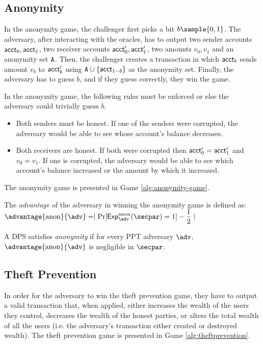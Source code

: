 \subsection{Anonymity}

In the anonymity game, the challenger first picks a bit $b\sample \{0,1\}$. The adversary, after interacting with the oracles, has to output two sender accounts $\textup{\textsf{acct}}_0, \textup{\textsf{acct}}_1$, two receiver accounts $\textup{\textsf{acct}}_0^\prime, \textup{\textsf{acct}}_1^\prime$, two amounts $v_0, v_1$ and an anonymity set ${\mathtt{A}}$. Then, the challenger creates a transaction in which $\textup{\textsf{acct}}_b$ sends amount $v_b$ to $\textup{\textsf{acct}}_b^\prime$ using ${\mathtt{A}} \cup \{\textup{\textsf{acct}}_{1-b}\}$ as the anonymity set. Finally, the adversary has to guess $b$, and if they guess correctly, they win the game.

In the anonymity game, the following rules must be enforced or else the adversary could trivially guess $b$.
\begin{itemize}
    \item Both senders must be honest.
    If one of the senders were corrupted, the adversary would be able to see whose account's balance decreases.
    \item Both receivers are honest.
    If both were corrupted then $\textup{\textsf{acct}}_0^\prime = \textup{\textsf{acct}}_1^\prime$ and $v_0=v_1$.
    If one is corrupted, the adversary would be able to see which account's balance increased or the amount by which it increased.
\end{itemize}

The anonymity game is presented in Game \ref{alg:anonymity-game}.


\begin{definition}\label{def:anonymity} 
    The \emph{advantage} of the adversary in winning the anonymity game is defined as:
    $
        \advantage{\anonymity}{\adv} = \mid \Pr[\exper^{\anonymity}_{\adv}(\secpar)=1] - \dfrac{1}{2} \mid
    $

    A DPS satisfies \emph{anonymity} if for every PPT adversary $\adv$, $\advantage{\anonymity}{\adv}$ is negligible in  $\secpar$.
\end{definition}

\subsection{Theft Prevention}
In order for the adversary to win the theft prevention game, they have to output a valid transaction that, when applied, either increases the wealth of the users they control, decreases the wealth of the honest parties, or alters the total wealth of all the users (i.e. the adversary's transaction either created or destroyed wealth). The theft prevention game is presented in Game \ref{alg:theftprevention}.

